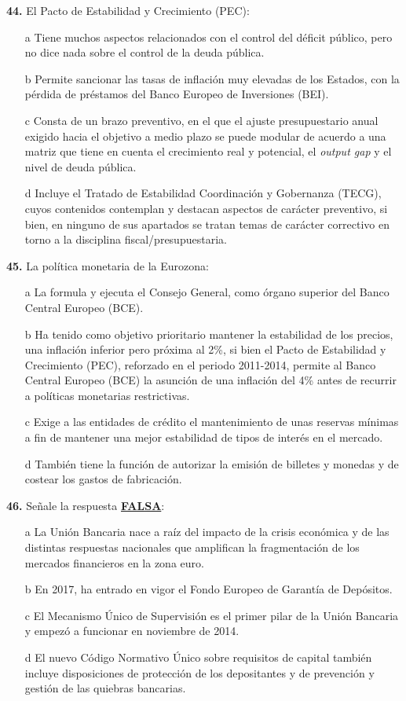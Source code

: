 \documentclass{nuevotema}
\begin{document}
\textbf{44.} El Pacto de Estabilidad y Crecimiento (PEC):

\begin{itemize}
	\item[a] Tiene muchos aspectos relacionados con el control del déficit público, pero no dice nada sobre el control de la deuda pública.
	\item[b] Permite sancionar las tasas de inflación muy elevadas de los Estados, con la pérdida de préstamos del Banco Europeo de Inversiones (BEI).
	\item[c] Consta de un brazo preventivo, en el que el ajuste presupuestario anual exigido hacia el objetivo a medio plazo se puede modular de acuerdo a una matriz que tiene en cuenta el crecimiento real y potencial, el \textit{output gap} y el nivel de deuda pública.
	\item[d] Incluye el Tratado de Estabilidad Coordinación y Gobernanza (TECG), cuyos contenidos contemplan y destacan aspectos de carácter preventivo, si bien, en ninguno de sus apartados se tratan temas de carácter correctivo en torno a la disciplina fiscal/presupuestaria.
\end{itemize}

\textbf{45.} La política monetaria de la Eurozona:

\begin{itemize}
	\item[a] La formula y ejecuta el Consejo General, como órgano superior del Banco Central Europeo (BCE).
	\item[b] Ha tenido como objetivo prioritario mantener la estabilidad de los precios, una inflación inferior pero próxima al 2\%, si bien el Pacto de Estabilidad y Crecimiento (PEC), reforzado en el periodo 2011-2014, permite al Banco Central Europeo (BCE) la asunción de una inflación del 4\% antes de recurrir a políticas monetarias restrictivas.
	\item[c] Exige a las entidades de crédito el mantenimiento de unas reservas mínimas a fin de mantener una mejor estabilidad de tipos de interés en el mercado.
	\item[d] También tiene la función de autorizar la emisión de billetes y monedas y de costear los gastos de fabricación.
\end{itemize}

\textbf{46.} Señale la respuesta \underline{\textbf{FALSA}}:

\begin{itemize}
	\item[a] La Unión Bancaria nace a raíz del impacto de la crisis económica y de las distintas respuestas nacionales que amplifican la fragmentación de los mercados financieros en la zona euro.
	\item[b] En 2017, ha entrado en vigor el Fondo Europeo de Garantía de Depósitos.
	\item[c] El Mecanismo Único de Supervisión es el primer pilar de la Unión Bancaria y empezó a funcionar en noviembre de 2014.
	\item[d] El nuevo Código Normativo Único sobre requisitos de capital también incluye disposiciones de protección de los depositantes y de prevención y gestión de las quiebras bancarias.
\end{itemize}
\end{document}
